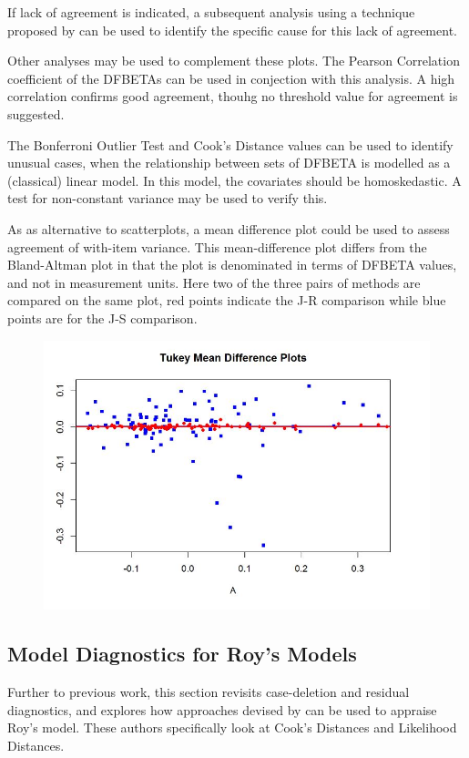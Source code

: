 \documentclass[12pt, a4paper]{report}
\theoremstyle{plain}
\theoremstyle{definition}
\theoremstyle{remark}
\begin{document}
If lack of agreement is indicated, a subsequent analysis using a technique proposed by \citet{ARoy2009} can be used to identify the specific cause for this lack of agreement.
	
Other analyses may be used to complement these plots. The Pearson Correlation coefficient of the DFBETAs can be used in conjection with this analysis. A high correlation confirms good agreement, thouhg no threshold value for agreement is suggested.
	
The Bonferroni Outlier Test and Cook's Distance values can be used to identify unusual cases, when the relationship between sets of DFBETA is modelled as a (classical) linear model. In this model, the covariates should be homoskedastic. A test for non-constant variance may be used to verify this. 
	
	
As as alternative to scatterplots, a mean difference plot could be used to assess agreement of with-item variance. This mean-difference plot differs from the Bland-Altman plot in that the plot is denominated in terms of DFBETA values, and not in measurement units. Here two of the three pairs of methods are compared on the same plot, red points indicate the J-R comparison while blue points are for the J-S comparison.

	\begin{figure}[h!
		]
		\centering
		\includegraphics[width=0.7\linewidth]{images/04-TMDplot}
		
	\end{figure}
	
\subsection{Model Diagnostics for Roy's Models}
	
Further to previous work, this section revisits case-deletion and residual diagnostics, and explores how approaches devised by  \citet{Galecki} can be used to appraise Roy's model. These authors specifically look at Cook's Distances and Likelihood Distances.
%	
	
\end{document}
